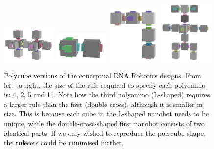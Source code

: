 \begin{figure}
    \centering\includegraphics[align=c,width=0.24\textwidth]{figures/dnaRoboticPolycubes/doubleplus.png}\hfill
    \centering\includegraphics[align=c,width=0.24\textwidth]{figures/dnaRoboticPolycubes/swimmer.png}\hfill
    \centering\includegraphics[align=c,width=0.24\textwidth]{figures/dnaRoboticPolycubes/L.png}\hfill
    \centering\includegraphics[align=c,width=0.24\textwidth]{figures/dnaRoboticPolycubes/robot.png}
\caption{Polycube versions of the conceptual DNA Robotics designs. From left to right, the size of the rule required to specify each polyomino is: \href{https://akodiat.github.io/polycubes?hexRule=040890040707840c00000000888a00000000101400000000}{\underline{4}}, \href{https://akodiat.github.io/polycubes?hexRule=0a040b0b080a840e00000000}{\underline{2}}, \href{https://akodiat.github.io/polycubes?hexRule=06000c0b00001284000b080a0090140b00000000188c0000000014980000}{\underline{5}} and \href{https://akodiat.github.io/polycubes?hexRule=0406008800008400240000008c0800000000903400000000980c2f2f10129c1a0000000094000000002214141c000000000028a40000ac3200000000b43000000000}{\underline{11}}. Note how the third polyomino (L-shaped) requires a larger rule than the first (double cross), although it is smaller in size. This is because each cube in the L-shaped nanobot needs to be unique, while the double-cross-shaped first nanobot consists of two identical parts. If we only wished to reproduce the polycube shape, the rulesets could be minimised further.}
\label{fig:dnaRoboticPolycubes}\end{figure}

